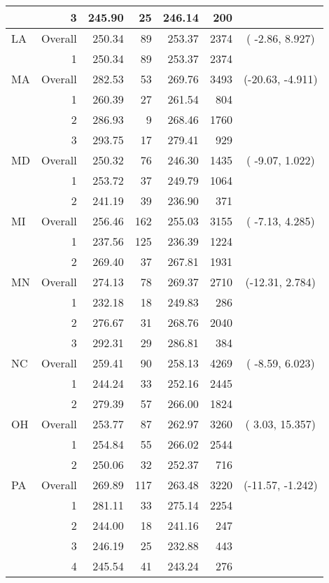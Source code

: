 \begin{longtable}{lrrr@{\extracolsep{.25cm}}rrc}
   & 3 & 245.90 &  25 & 246.14 & 200 &  \\ 
   \hline
LA & Overall & 250.34 &  89 & 253.37 & 2374 & ( -2.86,   8.927) \\ 
   & 1 & 250.34 &  89 & 253.37 & 2374 &  \\ 
   \hline
MA & Overall & 282.53 &  53 & 269.76 & 3493 & (-20.63,  -4.911) \\ 
   & 1 & 260.39 &  27 & 261.54 & 804 &  \\ 
   & 2 & 286.93 &   9 & 268.46 & 1760 &  \\ 
   & 3 & 293.75 &  17 & 279.41 & 929 &  \\ 
   \hline
MD & Overall & 250.32 &  76 & 246.30 & 1435 & ( -9.07,   1.022) \\ 
   & 1 & 253.72 &  37 & 249.79 & 1064 &  \\ 
   & 2 & 241.19 &  39 & 236.90 & 371 &  \\ 
   \hline
MI & Overall & 256.46 & 162 & 255.03 & 3155 & ( -7.13,   4.285) \\ 
   & 1 & 237.56 & 125 & 236.39 & 1224 &  \\ 
   & 2 & 269.40 &  37 & 267.81 & 1931 &  \\ 
   \hline
MN & Overall & 274.13 &  78 & 269.37 & 2710 & (-12.31,   2.784) \\ 
   & 1 & 232.18 &  18 & 249.83 & 286 &  \\ 
   & 2 & 276.67 &  31 & 268.76 & 2040 &  \\ 
   & 3 & 292.31 &  29 & 286.81 & 384 &  \\ 
   \hline
NC & Overall & 259.41 &  90 & 258.13 & 4269 & ( -8.59,   6.023) \\ 
   & 1 & 244.24 &  33 & 252.16 & 2445 &  \\ 
   & 2 & 279.39 &  57 & 266.00 & 1824 &  \\ 
   \hline
OH & Overall & 253.77 &  87 & 262.97 & 3260 & (  3.03,  15.357) \\ 
   & 1 & 254.84 &  55 & 266.02 & 2544 &  \\ 
   & 2 & 250.06 &  32 & 252.37 & 716 &  \\ 
   \hline
PA & Overall & 269.89 & 117 & 263.48 & 3220 & (-11.57,  -1.242) \\ 
   & 1 & 281.11 &  33 & 275.14 & 2254 &  \\ 
   & 2 & 244.00 &  18 & 241.16 & 247 &  \\ 
   & 3 & 246.19 &  25 & 232.88 & 443 &  \\ 
   & 4 & 245.54 &  41 & 243.24 & 276 &  \\ 

\end{longtable}
